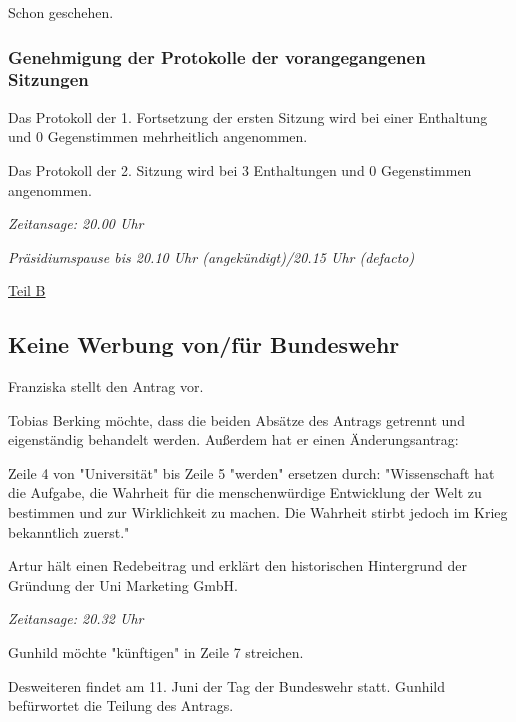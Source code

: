 \documentclass[ngerman,headheight=70pt]{scrartcl}
\begin{document}
    Schon geschehen.

    \subsubsection{Genehmigung der Protokolle der vorangegangenen Sitzungen}

    Das Protokoll der 1. Fortsetzung der ersten Sitzung wird bei einer Enthaltung
    und 0 Gegenstimmen mehrheitlich angenommen.

    Das Protokoll der 2. Sitzung  wird bei 3 Enthaltungen und 0 Gegenstimmen
    angenommen.

    \textit{Zeitansage: 20.00 Uhr}

    \textit{Präsidiumspause bis 20.10 Uhr (angekündigt)/20.15 Uhr (defacto)}

    \newpage
    {\Large \underline{Teil B}}


    \subsection{Keine Werbung von/für Bundeswehr}

    Franziska stellt den Antrag vor.

    Tobias Berking möchte, dass die beiden Absätze des Antrags getrennt
    und eigenständig behandelt werden. Außerdem hat er einen Änderungsantrag:

    Zeile 4 von "Universität" bis Zeile 5 "werden" ersetzen durch:
    "Wissenschaft hat die Aufgabe, die Wahrheit für die menschenwürdige
    Entwicklung der Welt zu bestimmen und zur Wirklichkeit zu machen. Die
    Wahrheit stirbt jedoch im Krieg bekanntlich zuerst."

    Artur hält einen Redebeitrag und erklärt den historischen Hintergrund
    der Gründung der Uni Marketing GmbH.

    \textit{Zeitansage: 20.32 Uhr}

    Gunhild möchte "künftigen" in Zeile 7 streichen.

    Desweiteren findet am 11. Juni der Tag der Bundeswehr statt. Gunhild
    befürwortet die Teilung des Antrags.
\end{document}
